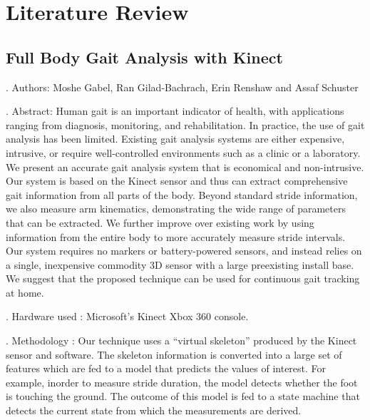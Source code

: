 \chapter{Literature Review} \label{Literature Review}
\section{Full Body Gait Analysis with Kinect} \label{Full Body Gait Analysis with Kinect}
. Authors:
\noindent Moshe Gabel, Ran Gilad-Bachrach, Erin Renshaw and Assaf Schuster

. Abstract:
\noindent Human gait is an important indicator of health, with applications ranging from diagnosis, monitoring, and rehabilitation. In practice, the use of gait analysis has been limited. Existing gait analysis systems are either expensive, intrusive, or require well-controlled environments such as a clinic or a laboratory.
We present an accurate gait analysis system that is economical and non-intrusive. Our system is based on the Kinect sensor and thus can extract comprehensive gait information from all parts of the body. Beyond standard stride information, we also measure arm kinematics, demonstrating the wide range of parameters that can be extracted. We further improve over existing work by using information from the entire body to more accurately measure stride intervals. Our system requires no markers or battery-powered sensors, and instead relies on a single, inexpensive commodity 3D sensor with a large preexisting install base. We suggest that the proposed technique can be used for continuous gait tracking at home.

. Hardware used :
\noindent Microsoft’s Kinect Xbox 360 console.

. Methodology :
\noindent Our technique uses a “virtual skeleton” produced by the Kinect sensor and software. The skeleton information is converted into a large set of features which are fed to a model that predicts the values of interest. For example, inorder to measure stride duration, the model detects whether the foot is touching the ground. The outcome of this model is fed to a state machine that detects the current state from which the measurements are derived.

